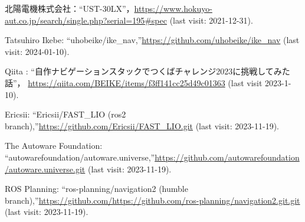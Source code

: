 \documentclass[twocolumn,9pt]{jsproceedings}
\begin{document}
\begin{thebibliography}{99}



  北陽電機株式会社：``UST-30LX''，\url{https://www.hokuyo-aut.co.jp/search/single.php?serial=195#spec} (last visit: 2021-12-31).




  Tatsuhiro Ikebe: ``uhobeike/ike\_nav,''\url{https://github.com/uhobeike/ike_nav} (last visit: 2024-01-10).

  Qiita : ``自作ナビゲーションスタックでつくばチャレンジ2023に挑戦してみた話''，
  \url{https://qiita.com/BEIKE/items/f3ff141cc25d49c01363} (last visit 2023-1-10).

  Ericsii: ``Ericsii/FAST\_LIO (ros2 branch),''\url{https://github.com/Ericsii/FAST_LIO.git} (last visit: 2023-11-19).

  The Autoware Foundation: ``autowarefoundation/autoware.universe,''\url{https://github.com/autowarefoundation/autoware.universe.git} (last visit: 2023-11-19).

  ROS Planning: ``ros-planning/navigation2 (humble branch),''\url{https://github.com/https://github.com/ros-planning/navigation2.git.git} (last visit: 2023-11-19).


\end{thebibliography}
\end{document}
